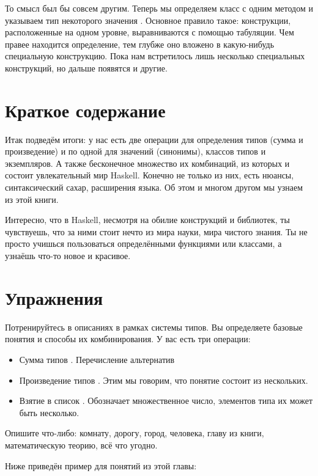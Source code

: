 То смысл был бы совсем другим. Теперь мы определяем класс  с
одним методом \In{==} и указываем тип некоторого значения \In{(/=)}.
Основное правило такое: конструкции, расположенные на одном уровне,
выравниваются с помощью табуляции. Чем правее находится определение, тем
глубже оно вложено в какую-нибудь специальную конструкцию. Пока нам
встретилось лишь несколько специальных конструкций, но дальше появятся и
другие.

\section{Краткое содержание}

Итак подведём итоги: у нас есть две операции для определения типов
(сумма и произведение) и по одной для значений (синонимы), классов типов
и экземпляров. А также бесконечное множество их комбинаций, из которых и
состоит увлекательный мир Haskell. Конечно не только из них, есть
нюансы, синтаксический сахар, расширения языка. Об этом и многом другом
мы узнаем из этой книги.

Интересно, что в Haskell, несмотря на обилие конструкций и библиотек, ты
чувствуешь, что за ними стоит нечто из мира науки, мира чистого знания.
Ты не просто учишься пользоваться определёнными функциями или классами,
а узнаёшь что-то новое и красивое.

\section{Упражнения}

Потренируйтесь в описаниях в рамках системы типов. Вы определяете
базовые понятия и способы их комбинирования. У вас есть три операции:

\begin{itemize}
\item
  Сумма типов . Перечисление альтернатив
\item
  Произведение типов . Этим мы говорим, что понятие
  состоит из нескольких.
\item
  Взятие в список \In{[T]}. Обозначает множественное число, элементов
  типа  их может быть несколько.
\end{itemize}

Опишите что-либо: комнату, дорогу, город, человека, главу из книги,
математическую теорию, всё что угодно.

Ниже приведён пример для понятий из этой главы:


